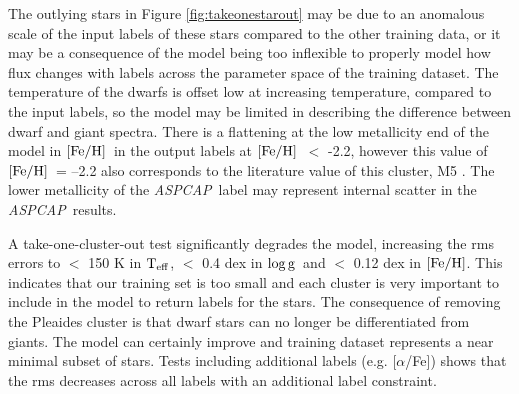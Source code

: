 \documentclass[12pt, preprint]{aastex}
\newcommand{\teff}{\mbox{$\rm T_{eff}$}}
\newcommand{\feh}{\mbox{$\rm [Fe/H]$}}
\newcommand{\logg}{\mbox{$\rm \log g$}}
\newcommand{\aspcap}{\textsl{ASPCAP}}
\begin{document}

The outlying stars in Figure \ref{fig:takeonestarout} may be due to an anomalous scale of the input labels of these stars compared to the other training data, or it may be a consequence of the model being too inflexible to properly model how flux changes with labels across the parameter space of the training dataset. The temperature of the dwarfs is offset low at increasing temperature, compared to the input labels, so the model may be limited in describing the difference between dwarf and giant spectra. There is a flattening at the low metallicity end of the model in \feh\ in the output labels at \feh\ $<$ -2.2, however this value of \feh\ = --2.2 also corresponds to the literature value of this cluster, M5 \citep{Meszaros2013}. The lower metallicity of the \aspcap\ label may represent internal scatter in the \aspcap\ results.

A take-one-cluster-out test significantly degrades the model, increasing the rms errors to $<$ 150 K in \teff, $<$ 0.4 dex in \logg\ and $<$ 0.12 dex in \feh. This indicates that our training set is too small and each cluster is very important to include in the model to return labels for the stars. The consequence of removing the Pleaides cluster is that dwarf stars can no longer be differentiated from giants. The model can certainly improve and training dataset represents a near minimal subset of stars. Tests including additional labels (e.g. [$\alpha$/Fe]) shows that the rms decreases across all labels with an additional label constraint. 
\end{document}
